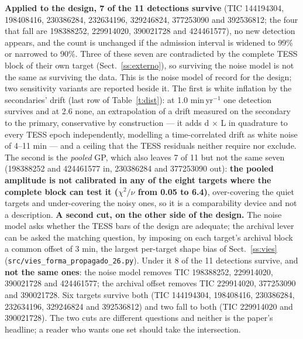 \documentclass{aa}
\begin{document}
\textbf{Applied to the design, 7 of the 11 detections survive} (TIC 144194304, 198408416, 230386284, 232634196, 329246824, 377253090 and 392536812; the four that fall are 198388252, 229914020, 390021728 and 424461577), no new detection appears, and the count is unchanged if the admission interval is widened to 99\% or narrowed to 90\%. Three of these seven are contradicted by the complete TESS block of their own target (Sect.~\ref{ss:externo}), so surviving the noise model is not the same as surviving the data. This is the noise model of record for the design; two sensitivity variants are reported beside it. The first is white inflation by the secondaries' drift (last row of Table~\ref{t:dist}): at 1.0 min\,yr$^{-1}$ one detection survives and at 2.6 none, an extrapolation of a drift measured on the secondary to the primary, conservative by construction --- it adds d $\times$ L in quadrature to every TESS epoch independently, modelling a time-correlated drift as white noise of 4--11 min --- and a ceiling that the TESS residuals neither require nor exclude. The second is the \textit{pooled} GP, which also leaves 7 of 11 but not the same seven (198388252 and 424461577 in, 230386284 and 377253090 out): \textbf{the pooled amplitude is not calibrated in any of the eight targets where the complete block can test it ($\chi^2/\nu$ from 0.05 to 6.4)}, over-covering the quiet targets and under-covering the noisy ones, so it is a comparability device and not a description. \textbf{A second cut, on the other side of the design.} The noise model asks whether the TESS bars of the design are adequate; the archival lever can be asked the matching question, by imposing on each target's archival block a common offset of 3 min, the largest per-target shape bias of Sect.~\ref{ss:vies} (\texttt{src/\allowbreak vies\_\allowbreak forma\_\allowbreak propagado\_\allowbreak 26.py}). Under it 8 of the 11 detections survive, and \textbf{not the same ones}: the noise model removes TIC 198388252, 229914020, 390021728 and 424461577; the archival offset removes TIC 229914020, 377253090 and 390021728. Six targets survive both (TIC 144194304, 198408416, 230386284, 232634196, 329246824 and 392536812) and two fall to both (TIC 229914020 and 390021728). The two cuts are different questions and neither is the paper's headline; a reader who wants one set should take the intersection.
\end{document}
